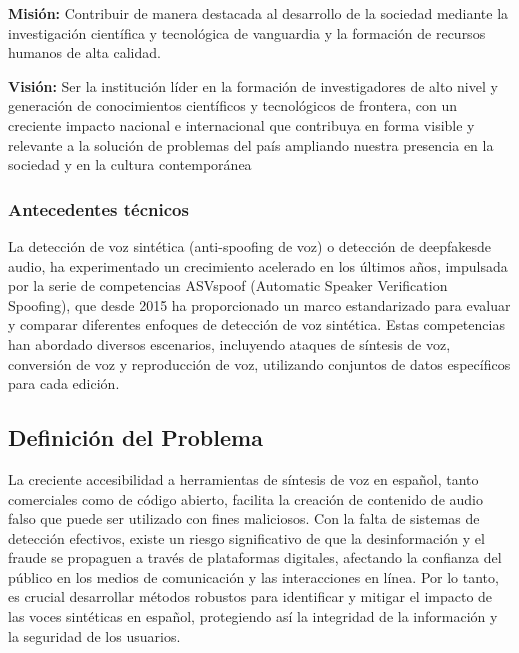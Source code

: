 \textbf{Misión:} Contribuir de manera destacada al desarrollo de la sociedad mediante la investigación científica y tecnológica de vanguardia y la formación de recursos humanos de alta calidad.

\textbf{Visión:} Ser la institución líder en la formación de investigadores de alto nivel y generación de conocimientos científicos y tecnológicos de frontera, con un creciente impacto nacional e internacional que contribuya en forma visible y relevante a la solución de problemas del país ampliando nuestra presencia en la sociedad y en la cultura contemporánea

\subsubsection{Antecedentes técnicos}
\label{subsec: antecedentes_tecnicos}

La detección de voz sintética (anti-spoofing de voz) o detección de deepfakesde audio, ha experimentado un crecimiento acelerado en los últimos años, impulsada por la serie de competencias ASVspoof (Automatic Speaker Verification Spoofing), que desde 2015 ha proporcionado un marco estandarizado para evaluar y comparar diferentes enfoques de detección de voz sintética. Estas competencias han abordado diversos escenarios, incluyendo ataques de síntesis de voz, conversión de voz y reproducción de voz, utilizando conjuntos de datos específicos para cada edición.

\subsection{Definición del Problema}
\label{sec:problema}

La creciente accesibilidad a herramientas de síntesis de voz en español, tanto comerciales como de código abierto, facilita la creación de contenido de audio falso que puede ser utilizado con fines maliciosos. Con la falta de sistemas de detección efectivos, existe un riesgo significativo de que la desinformación y el fraude se propaguen a través de plataformas digitales, afectando la confianza del público en los medios de comunicación y las interacciones en línea. Por lo tanto, es crucial desarrollar métodos robustos para identificar y mitigar el impacto de las voces sintéticas en español, protegiendo así la integridad de la información y la seguridad de los usuarios.

